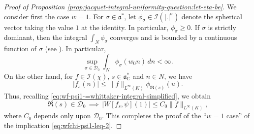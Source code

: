 \documentclass[reqno]{amsart}
\theoremstyle{plain} \newtheorem{theorem} {Theorem}
\theoremstyle{definition} \newtheorem{definition} [theorem] {Definition}
\theoremstyle{itplain} %
\numberwithin{equation}{section}
\numberwithin{theorem}{section}
\renewcommand{\geq}{\geqslant}
\renewcommand{\leq}{\leqslant}
\begin{document}
\begin{proof}[Proof of Proposition \ref{prop:jacquet-integral-uniformity-question:let-eta-be}]
  We consider first the case $w = 1$.  For $\sigma \in \mathfrak{a}^*$, let $\phi_{\sigma } \in \mathcal{I}(|.|^{\sigma})$ denote the spherical vector taking the value $1$ at the identity.  In particular, $\phi_\sigma \geq 0$.  If $\sigma$ is strictly dominant, then the integral $\int_{N} \phi_\sigma$ converges and is bounded by a continuous function of $\sigma$ (see \cite[\S10.1.2]{MR1170566}).  In particular,
  \begin{equation*}
    \sup_{\sigma \in \mathcal{D}_0} \int_N \phi_\sigma(w_0 n) \, d n < \infty.
  \end{equation*}
  On the other hand, for $f \in \mathcal{I}(\chi)$, $s \in \mathfrak{a}_\mathbb{C}^*$ and $n \in N$, we have
  \begin{equation*}
    |f_s(n)| \leq \|f\|_{L^\infty(K)} \phi_{\Re(s)}(u).
  \end{equation*}
  Thus, recalling \eqref{eq:wf-psi1-=whittaker-integral-simplified}, we obtain
  \begin{equation*}
    \Re(s) \in \mathcal{D}_0
    \,
    \implies
    \,
    |W[f_s,\psi](1)|
    \leq
    C_0
    \|f\|_{L^\infty(K)},
  \end{equation*}
  where $C_0$ depends only upon $\mathcal{D}_0$.
  This completes the proof of the ``$w = 1$ case'' of the implication \eqref{eq:wfchi-psi1-leq-2}.


\end{proof}
\end{document}
